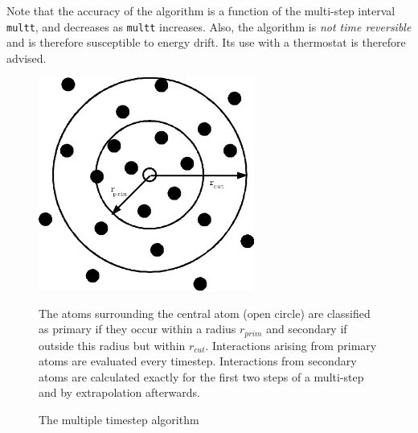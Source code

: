 Note that the accuracy of the algorithm is a function of the
multi-step interval {\tt multt}, and decreases as {\tt multt}
increases. Also, the algorithm is {\em not
time reversible} and is therefore susceptible to energy drift. Its use
with a thermostat is therefore advised.

\begin{figure}[ht]
\begin{center}
\includegraphics[height=7cm]{multi.eps}
\caption{The multiple timestep algorithm}
\end{center}
The atoms surrounding the central atom (open circle) are classified as
primary if they occur within a radius $r_{prim}$ and secondary if
outside this radius but within $r_{cut}$. Interactions arising from
primary atoms are evaluated every timestep. Interactions from secondary atoms are calculated exactly
for the first two steps of a multi-step and by extrapolation
afterwards.
\end{figure}


